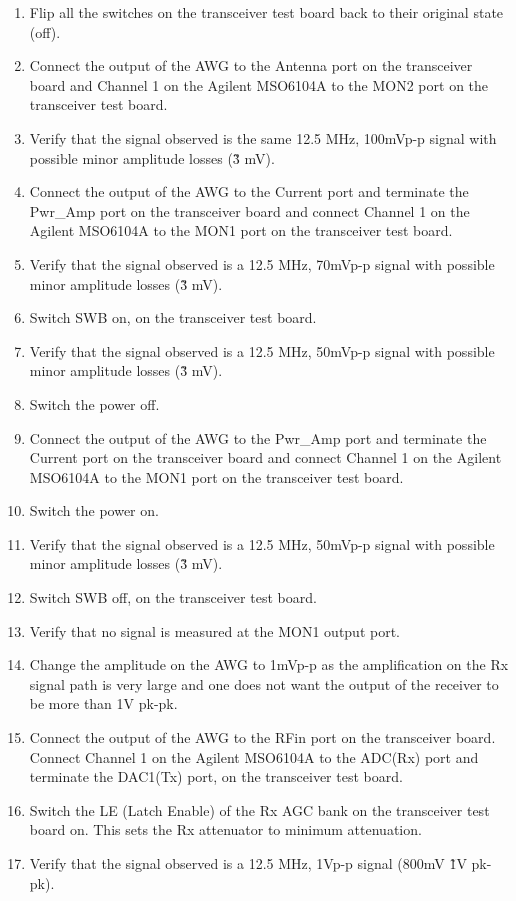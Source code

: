 \begin{enumerate}
	\item Flip all the switches on the transceiver test board back to their original state (off).
	\item Connect the output of the AWG to the Antenna port on the transceiver board and Channel 1 on the Agilent MSO6104A to the MON2 port on the transceiver test board.
	\item Verify that the signal observed is the same 12.5 MHz, 100mVp-p signal with possible minor amplitude losses (\~ 3 mV).
	\item Connect the output of the AWG to the Current port and terminate the Pwr\_Amp port on the transceiver board and connect Channel 1 on the Agilent MSO6104A to the MON1 port on the transceiver test board.
	\item Verify that the signal observed is a 12.5 MHz, 70mVp-p signal with possible minor amplitude losses (\~ 3 mV).
	\item Switch SWB on, on the transceiver test board.
	\item Verify that the signal observed is a 12.5 MHz, 50mVp-p signal with possible minor amplitude losses (\~ 3 mV).
	\item Switch the power off.
	\item Connect the output of the AWG to the Pwr\_Amp port and terminate the Current port on the transceiver board and connect Channel 1 on the Agilent MSO6104A to the MON1 port on the transceiver test board.
	\item Switch the power on.
	\item Verify that the signal observed is a 12.5 MHz, 50mVp-p signal with possible minor amplitude losses (\~ 3 mV).
	\item Switch SWB off, on the transceiver test board.
	\item Verify that no signal is measured at the MON1 output port.
	\item Change the amplitude on the AWG to 1mVp-p as the amplification on the Rx signal path is very large and one does not want the output of the receiver to be more than 1V pk-pk.
	\item Connect the output of the AWG to the RFin port on the transceiver board. Connect Channel 1 on the Agilent MSO6104A to the ADC(Rx) port and terminate the DAC1(Tx) port, on the transceiver test board.
	\item Switch the LE (Latch Enable) of the Rx AGC bank on the transceiver test board on. This sets the Rx attenuator to minimum attenuation.
	\item Verify that the signal observed is a 12.5 MHz, 1Vp-p signal (800mV \~ 1V pk-pk).

\end{enumerate}
